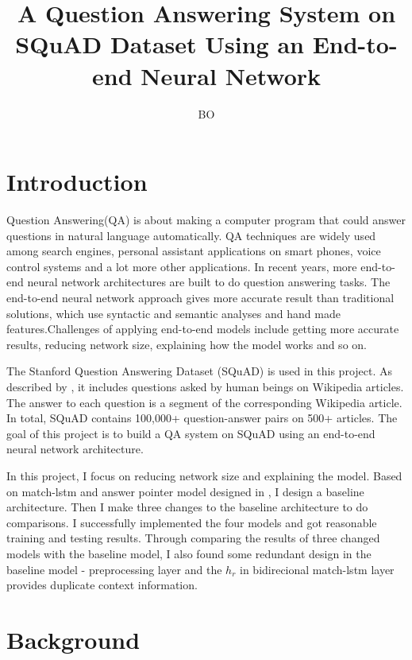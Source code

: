 \documentclass[modernstyle,12pt]{sjsuthesis}
\title{A Question Answering System on SQuAD Dataset Using an End-to-end Neural Network}
\author{BO}{LI}
\theoremstyle{definition}
\begin{document}
\raggedright          %
\parindent=30pt       %




\chapter{Introduction}

Question Answering(QA) is about making a computer program that could answer questions in natural language automatically. QA techniques are widely used among search engines, personal assistant applications on smart phones, voice control systems and a lot more other applications. In recent years, more end-to-end neural network architectures are built to do question answering tasks. The end-to-end neural network approach gives more accurate result than traditional solutions, which use syntactic and semantic analyses and hand made features.Challenges of applying end-to-end models include getting more accurate results, reducing network size, explaining how the model works and so on.

The Stanford Question Answering Dataset (SQuAD) is used in this project. As described by \cite{rajpurkar2016squad}, it includes questions asked by human beings on Wikipedia articles. The answer to each question is a segment of the corresponding Wikipedia article. In total, SQuAD contains 100,000+ question-answer pairs on 500+ articles. The goal of this project is to build a QA system on SQuAD using an end-to-end neural network architecture.

In this project, I focus on reducing network size and explaining the model. Based on match-lstm and answer pointer model designed in \cite{wang2016machine}, I design a baseline architecture. Then I make three changes to the baseline architecture to do comparisons. I successfully implemented the four models and got reasonable training and testing results. Through comparing the results of three changed models with the baseline model, I also found some redundant design in the baseline model - preprocessing layer and the $h_r$ in bidirecional match-lstm layer provides duplicate context information.



\chapter{Background}
\end{document}
